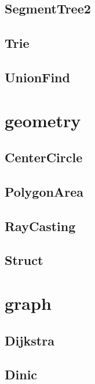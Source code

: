 \subsection{ SegmentTree2}
\raggedbottom
\hrulefill
\subsection{ Trie}
\raggedbottom
\hrulefill
\subsection{ UnionFind}
\raggedbottom
\hrulefill

\section{geometry}
\subsection{ CenterCircle}
\raggedbottom
\hrulefill
\subsection{ PolygonArea}
\raggedbottom
\hrulefill
\subsection{ RayCasting}
\raggedbottom
\hrulefill
\subsection{ Struct}
\raggedbottom
\hrulefill

\section{graph}
\subsection{ Dijkstra}
\raggedbottom
\hrulefill
\subsection{ Dinic}
\raggedbottom
\hrulefill
